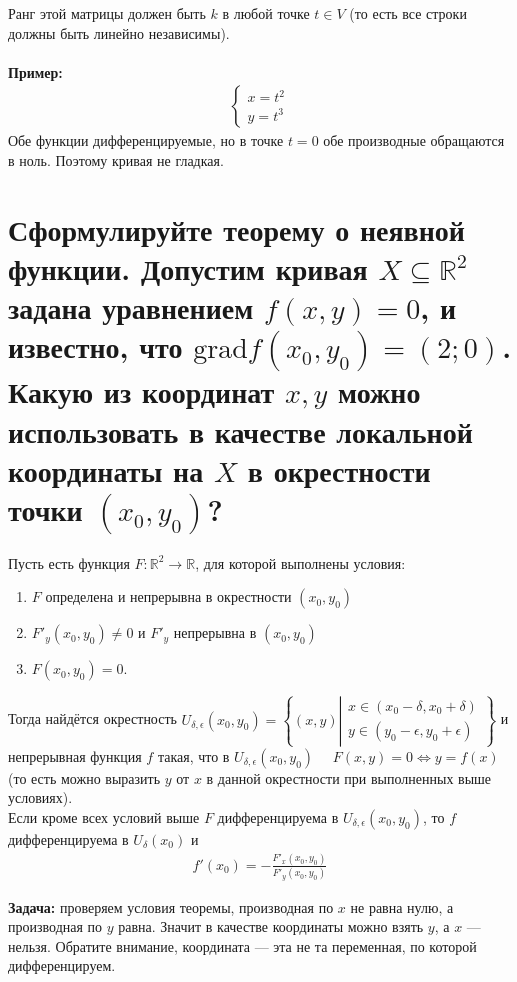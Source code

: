 \documentclass{article}
\begin{document}
Ранг этой матрицы должен быть $k$ в любой точке $t \in V$ (то есть все строки должны быть линейно независимы).
\\\\
\textbf{Пример:}
\begin{gather*}
\begin{cases}
    x=t^2\\
    y=t^3
\end{cases}
\end{gather*}
Обе функции дифференцируемые, но в точке $t=0$ обе производные обращаются в ноль. Поэтому кривая не гладкая.

\section{Сформулируйте теорему о неявной функции. Допустим кривая $X \subseteq \mathbb{R}^2$ задана уравнением $f(x,y)=0$, и известно, что $\mathrm{grad}f(x_0,y_0)=(2;0)$. Какую из координат $x,y$ можно использовать в качестве локальной координаты на $X$ в окрестности точки $(x_0,y_0)$?}
\begin{theorem}
Пусть есть функция $F: \mathbb{R}^2\xrightarrow{} \mathbb{R}$, для которой выполнены условия:
\begin{enumerate}
\item $F$ определена и непрерывна в окрестности $(x_0,y_0)$ \item $F'_y(x_0,y_0)\not=0$ и $F'_y$ непрерывна в $(x_0,y_0)$ \item $F(x_0, y_0)=0$.
\end{enumerate}
Тогда найдётся окрестность $U_{\delta,\epsilon}(x_0,y_0)=\left\{(x,y)\left|\begin{array}{l}
     x \in (x_0-\delta, x_0 +\delta) \\
     y \in (y_0-\epsilon,y_0+\epsilon)
\end{array}\right.\right\}$ и непрерывная функция $f$ такая, что в $U_{\delta,\epsilon}(x_0,y_0)\quad$ $F(x,y)=0 \Leftrightarrow y = f(x)$ (то есть можно выразить $y$ от $x$ в данной окрестности при выполненных выше условиях).\\
Если кроме всех условий выше $F$ дифференцируема в $U_{\delta,\epsilon}(x_0,y_0)$, то $f$ дифференцируема в $U_{\delta}(x_0)$ и
\begin{gather*}
    f'(x_0)=-\frac{F'_x(x_0,y_0)}{F'_y(x_0,y_0)}
\end{gather*}
\end{theorem}
\textbf{Задача:} проверяем условия теоремы, производная по $x$ не равна нулю, а производная по $y$ равна. Значит в качестве координаты можно взять $y$, а $x$ --- нельзя. Обратите внимание, координата --- эта не та переменная, по которой дифференцируем.
\end{document}
